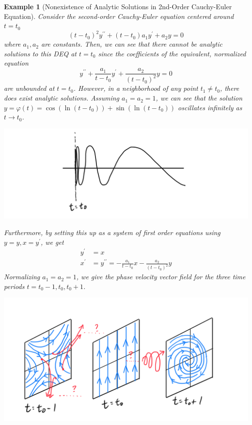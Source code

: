 \documentclass{article}
\newtheorem{example}{Example}[section]
\theoremstyle{remark}
\theoremstyle{definition}
\begin{document}
    \begin{example}[Nonexistence of Analytic Solutions in 2nd-Order Cauchy-Euler Equation]
    Consider the second-order Cauchy-Euler equation centered around $t = t_0$
    \[(t - t_0)^2 y^{\prime\prime} + (t - t_0) a_1 y^\prime + a_2 y = 0\]
    where $a_1, a_2$ are constants. Then, we can see that there cannot be analytic solutions to this DEQ at $t= t_0$ since the coefficients of the equivalent, normalized equation
    \[y^{\prime\prime} + \frac{a_1}{t - t_0} y^\prime + \frac{a_2}{(t-t_0)^2} y = 0\]
    are unbounded at $t = t_0$. However, in a neighborhood of any point $t_1 \neq t_0$, there does exist analytic solutions. Assuming $a_1 = a_2 = 1$, we can see that the solution $y = \varphi(t) = \cos(\ln{(t-t_0)}) + \sin(\ln{(t - t_0)})$ oscillates infinitely as $t \rightarrow t_0$. 
    \begin{center}
        \includegraphics[scale=0.25]{img/Oscillates_Infinitely.PNG}
    \end{center}
    Furthermore, by setting this up as a system of first order equations using $y = y, x = y^\prime$, we get
    \begin{align*}
        y^\prime & = x \\
        x^{\prime} & = y^{\prime\prime} = - \frac{a_1}{t - t_0} x - \frac{a_2}{(t - t_0)^2} y
    \end{align*}
    Normalizing $a_1 = a_2 = 1$, we give the phase velocity vector field for the three time periods $t = t_0 - 1, t_0, t_0 + 1$. 
    \begin{center}
        \includegraphics[scale=0.25]{img/Singular_Point_of_2nd_Cauchy_Euler.PNG}
    \end{center}
    \end{example}
\end{document}
